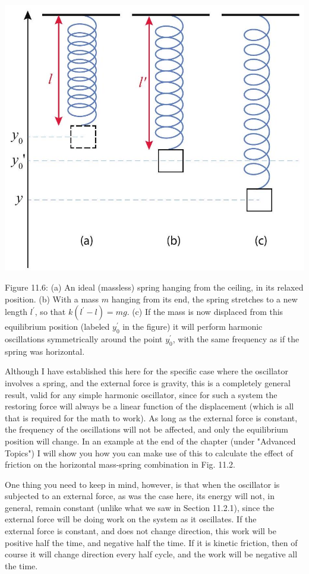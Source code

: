 \documentclass[10pt]{article}
\begin{document}
\begin{center}
\includegraphics[max width=\textwidth]{2024_09_14_9969b06773f10b6936e8g-279}
\end{center}

Figure 11.6: (a) An ideal (massless) spring hanging from the ceiling, in its relaxed position. (b) With a mass $m$ hanging from its end, the spring stretches to a new length $l^{\prime}$, so that $k\left(l^{\prime}-l\right)=m g$. (c) If the mass is now displaced from this equilibrium position (labeled $y_{0}^{\prime}$ in the figure) it will perform harmonic oscillations symmetrically around the point $y_{0}^{\prime}$, with the same frequency as if the spring was horizontal.

Although I have established this here for the specific case where the oscillator involves a spring, and the external force is gravity, this is a completely general result, valid for any simple harmonic oscillator, since for such a system the restoring force will always be a linear function of the displacement (which is all that is required for the math to work). As long as the external force is constant, the frequency of the oscillations will not be affected, and only the equilibrium position will change. In an example at the end of the chapter (under "Advanced Topics") I will show you how you can make use of this to calculate the effect of friction on the horizontal mass-spring combination in Fig. 11.2.

One thing you need to keep in mind, however, is that when the oscillator is subjected to an external force, as was the case here, its energy will not, in general, remain constant (unlike what we saw in Section 11.2.1), since the external force will be doing work on the system as it oscillates. If the\\
external force is constant, and does not change direction, this work will be positive half the time, and negative half the time. If it is kinetic friction, then of course it will change direction every half cycle, and the work will be negative all the time.
\end{document}
